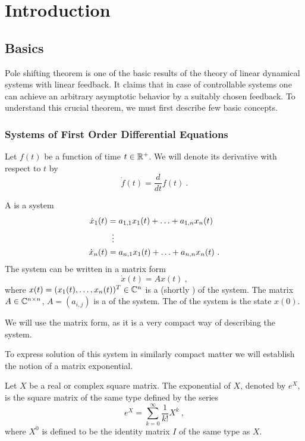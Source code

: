 \chapter{Introduction}
\label{chap:intr}

\section{Basics}
\label{sec:basics}

Pole shifting theorem is one of the basic results of the theory of linear dynamical systems with linear feedback. It claims that in case of controllable systems one can achieve an arbitrary asymptotic behavior by a suitably chosen feedback. To understand this crucial theorem, we must first describe few basic concepts.

\subsection{Systems of First Order Differential Equations}

\begin{remark}
	Let $f(t)$ be a function of time $t\in\mathbb{R}^+$. We will denote its derivative with respect to $t$ by $$\dot{f}(t)=\frac{d}{dt}f(t)\ .$$
\end{remark}

\begin{definition}
	A  is a system 
	\begin{align*}
		\dot{x}_1(t)&=a_{1,1}x_1(t)+\ldots+a_{1,n}x_n(t) \\
		&\vdotswithin{=} \\
		\dot{x}_n(t)&=a_{n,1}x_1(t)+\ldots+a_{n,n}x_n(t)\ .
	\end{align*}
	The system can be written in a matrix form $$\dot{x}(t)=Ax(t)\ ,$$ where $x(t)=(x_1(t),\ldots,x_n(t))^T \in \mathbb{C}^n$ is a  (shortly ) of the system. The matrix $A\in \mathbb{C}^{n\times n}$, $A=(a_{i,j})$ is a  of the system. The  of the system is the state $x(0)$.
\end{definition}

We will use the matrix form, as it is a very compact way of describing the system.

To express solution of this system in similarly compact matter we will establish the notion of a matrix exponential.

\begin{definition}
	Let $X$ be a real or complex square matrix. The exponential of $X$, denoted by $e^X$, is the square matrix of the same type defined by the series $$e^{X}=\sum _{k=0}^{\infty}\frac{1}{k!}X^{k}\ ,$$
	where $X^0$ is defined to be the identity matrix $I$ of the same type as $X$.
\end{definition}

